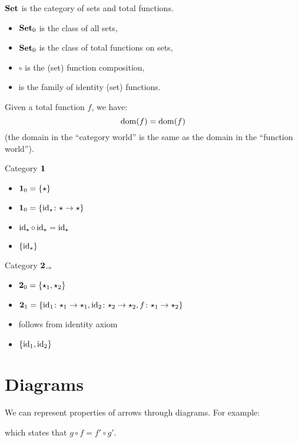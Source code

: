 \documentclass{scrartcl}
\newenvironment{category}{\begin{itemize}[leftmargin=.9in]}{\end{itemize}}
\newcommand{\catobj}[1]{\item[\textbf{Objects}] #1}
\newcommand{\catarr}[1]{\item[\textbf{Arrows}] #1}
\newcommand{\catcomp}[1]{\item[\textbf{Comp.}] #1}
\newcommand{\catid}[1]{\item[\textbf{Identity}] #1}
\newenvironment{diags}[1][0pt]{\begin{center}\vspace{#1}%
    \def\diagsspaceafter{#1}}{%
    \vspace{\diagsspaceafter}\end{center}}
\begin{document}
\begin{example}
  $\boldsymbol{\mathbf{Set}}$ is the category of sets and total functions.
  \begin{category}
    \catobj{$\boldsymbol{\mathbf{Set}}_{0}$ is the class of all sets,}
    \catarr{$\boldsymbol{\mathbf{Set}}_{0}$ is the class of total functions on sets,}
    \catcomp{$\circ$ is the (set) function composition,} \catid{is the
      family of identity (set) functions.}
  \end{category}
  Given a total function $f$, we have:
  \[ \operatorname*{dom}(f) = \operatorname*{dom}(f) \]
  (the domain in the ``category world'' is the same as the domain in
  the ``function world'').
\end{example}

\begin{example}
  Category $\boldsymbol{\mathbf{1}}$
  \begin{category}
    \catobj{$\boldsymbol{\mathbf{1}}_{0} = \left\{ \star \right\}$}
    \catarr{$\obs{\ccat{1}} = \set{\id_\star \colon \star \to \star}$}
    \catcomp{$\operatorname{id}_\star \circ \operatorname{id}_\star = \operatorname{id}_\star$}
    \catid{$\left\{ \operatorname{id}_\star \right\}$}
  \end{category}
\end{example}

\begin{example}
  Category $\ccat{2}_{\to}$
  \begin{category}
    \catobj{$\boldsymbol{\mathbf{2}}_0 = \left\{ \star_1, \star_2 \right\}$}
    \catarr{$\ccat{2}_1 = \set{\id_1 \colon \star_1 \to \star_1, \id_2
        \colon \star_2 \to \star_2, f \colon \star_1 \to \star_2}$}
    \catcomp{follows from identity axiom}
    \catid{$\left\{  \operatorname{id}_1, \operatorname{id}_2 \right\}$}
  \end{category}
\end{example}

\section{Diagrams}
We can represent properties of arrows through diagrams. For example:
\begin{diags}
\end{diags}
which states that $g \circ f = f' \circ g'$.
\end{document}

